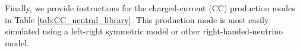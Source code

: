 
Finally, we provide instructions for the charged-current (CC) production modes in Table \ref{tab:CC_neutral_library}. This production mode is most easily simulated using a left-right symmetric model or other right-handed-neutrino model.

